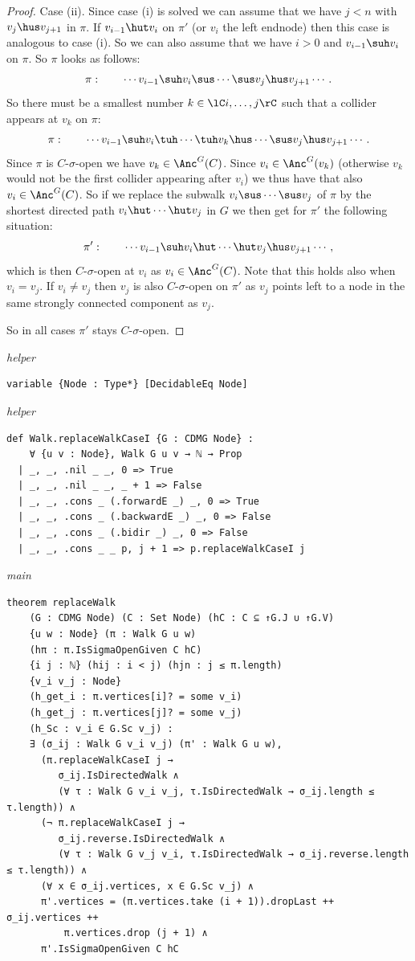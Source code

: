 {\begin{proof}
 Case (ii). Since case (i) is solved we can assume that we have $j<n$ with $v_j \hus v_{j+1}$ in $\pi$. 
 If $v_{i-1} \hut v_i$ on $\pi'$ (or $v_i$ the left endnode) then this case is analogous to case (i). 
 So we can also assume that we have $i > 0$ and $v_{i-1} \suh v_i$ on $\pi$. So $\pi$ looks as follows:
 \[\pi:\qquad \cdots v_{i-1} \suh v_i \sus \cdots \sus v_j \hus v_{j+1} \cdots. \]
 So there must be a smallest number $k \in \lC i,\dots,j\rC$ such that a collider appears at $v_k$ on $\pi$:
 \[\pi:\qquad \cdots v_{i-1} \suh v_i \tuh \cdots \tuh v_k \hus \cdots \sus v_j \hus v_{j+1} \cdots. \]
 Since $\pi$ is $C$-$\sigma$-open we have $v_k \in \Anc^G(C)$. Since $v_i \in \Anc^G(v_k)$ (otherwise $v_k$ would not be the first collider appearing after $v_i$) we thus have that also $v_i \in \Anc^G(C)$.
 So if we replace the subwalk $v_i \sus \cdots \sus v_j$ of $\pi$ by the shortest directed path $v_i \hut \cdots \hut v_j$ in $G$ we then get for $\pi'$ the following situation:
 \[\pi':\qquad \cdots v_{i-1} \suh v_i \hut \cdots \hut  v_j \hus v_{j+1} \cdots, \]
 which is then $C$-$\sigma$-open at $v_i$ as $v_i \in \Anc^G(C)$. Note that this holds also when $v_i=v_j$.
 If $v_i \neq v_j$ then $v_j$ is also $C$-$\sigma$-open on $\pi'$ as $v_j$ points left to a node in the same strongly connected component as $v_j$. 

 So in all cases $\pi'$ stays $C$-$\sigma$-open.
\end{proof}
\par}
\smallskip
{\small\textit{helper}}
\begin{verbatim}
variable {Node : Type*} [DecidableEq Node]
\end{verbatim}
{\small\textit{helper}}
\begin{verbatim}
def Walk.replaceWalkCaseI {G : CDMG Node} :
    ∀ {u v : Node}, Walk G u v → ℕ → Prop
  | _, _, .nil _ _, 0 => True
  | _, _, .nil _ _, _ + 1 => False
  | _, _, .cons _ (.forwardE _) _, 0 => True
  | _, _, .cons _ (.backwardE _) _, 0 => False
  | _, _, .cons _ (.bidir _) _, 0 => False
  | _, _, .cons _ _ p, j + 1 => p.replaceWalkCaseI j
\end{verbatim}
{\small\textit{main}}
\begin{verbatim}
theorem replaceWalk
    (G : CDMG Node) (C : Set Node) (hC : C ⊆ ↑G.J ∪ ↑G.V)
    {u w : Node} (π : Walk G u w)
    (hπ : π.IsSigmaOpenGiven C hC)
    {i j : ℕ} (hij : i < j) (hjn : j ≤ π.length)
    {v_i v_j : Node}
    (h_get_i : π.vertices[i]? = some v_i)
    (h_get_j : π.vertices[j]? = some v_j)
    (h_Sc : v_i ∈ G.Sc v_j) :
    ∃ (σ_ij : Walk G v_i v_j) (π' : Walk G u w),
      (π.replaceWalkCaseI j →
         σ_ij.IsDirectedWalk ∧
         (∀ τ : Walk G v_i v_j, τ.IsDirectedWalk → σ_ij.length ≤ τ.length)) ∧
      (¬ π.replaceWalkCaseI j →
         σ_ij.reverse.IsDirectedWalk ∧
         (∀ τ : Walk G v_j v_i, τ.IsDirectedWalk → σ_ij.reverse.length ≤ τ.length)) ∧
      (∀ x ∈ σ_ij.vertices, x ∈ G.Sc v_j) ∧
      π'.vertices = (π.vertices.take (i + 1)).dropLast ++ σ_ij.vertices ++
          π.vertices.drop (j + 1) ∧
      π'.IsSigmaOpenGiven C hC
\end{verbatim}
~%

\vspace{\appendixNotesGap}
